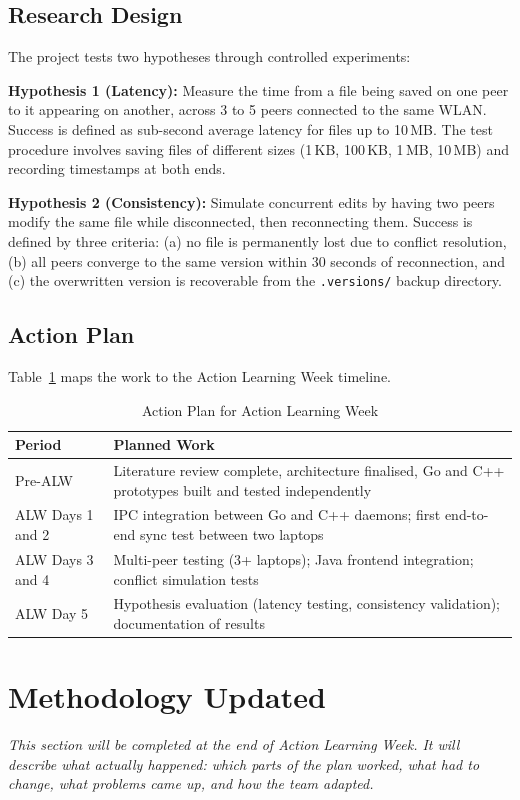 \subsection{Research Design}

The project tests two hypotheses through controlled experiments:

\textbf{Hypothesis 1 (Latency):} Measure the time from a file being saved on one peer to it appearing on another, across 3 to 5 peers connected to the same WLAN. Success is defined as sub-second average latency for files up to 10\,MB. The test procedure involves saving files of different sizes (1\,KB, 100\,KB, 1\,MB, 10\,MB) and recording timestamps at both ends.

\textbf{Hypothesis 2 (Consistency):} Simulate concurrent edits by having two peers modify the same file while disconnected, then reconnecting them. Success is defined by three criteria: (a) no file is permanently lost due to conflict resolution, (b) all peers converge to the same version within 30 seconds of reconnection, and (c) the overwritten version is recoverable from the \texttt{.versions/} backup directory.

\subsection{Action Plan}

Table~\ref{tab:action-plan} maps the work to the Action Learning Week timeline.

\begin{table}[htbp]
\centering
\caption{Action Plan for Action Learning Week}
\label{tab:action-plan}
\begin{tabular}{p{3cm} p{10cm}}
\toprule
\textbf{Period} & \textbf{Planned Work} \\
\midrule
Pre-ALW & Literature review complete, architecture finalised, Go and C++ prototypes built and tested independently \\
\midrule
ALW Days 1 and 2 & IPC integration between Go and C++ daemons; first end-to-end sync test between two laptops \\
\midrule
ALW Days 3 and 4 & Multi-peer testing (3+ laptops); Java frontend integration; conflict simulation tests \\
\midrule
ALW Day 5 & Hypothesis evaluation (latency testing, consistency validation); documentation of results \\
\bottomrule
\end{tabular}
\end{table}

\section{Methodology Updated}
\label{sec:method-updated}

\textit{This section will be completed at the end of Action Learning Week. It will describe what actually happened: which parts of the plan worked, what had to change, what problems came up, and how the team adapted.}
